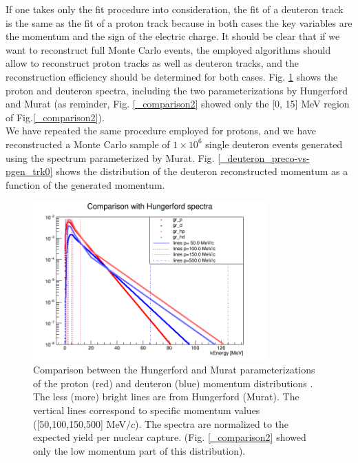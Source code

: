 \documentclass[12pt,a4paper,openright, oneside, titlepage]{book} %
\begin{document}
\noindent
If one takes only the fit procedure into consideration, 
the fit of a deuteron track is the same as the fit of a proton track because 
in both cases the key variables are the momentum and the sign of the electric charge.
It should be clear that if we want to reconstruct full Monte Carlo events,
the employed algorithms should allow to reconstruct proton tracks as well as deuteron tracks,
and the reconstruction efficiency should be determined for both cases.
Fig. \ref{_comparison} shows the proton and deuteron spectra, including
the two parameterizations by Hungerford and Murat
(as reminder, Fig. \ref{_comparison2} showed only the 
[0, 15] MeV region of Fig.\ref{_comparison2}).\\
We have repeated the same procedure employed for protons,
and we have reconstructed a Monte Carlo sample of $1 \times 10^6$ single deuteron events
generated using the spectrum parameterized by Murat. 
Fig. \ref{_deuteron_preco-vs-pgen_trk0} shows the distribution of the deuteron reconstructed momentum 
as a function of the generated momentum. 

\begin{figure}[h!]
\centering
\includegraphics[width =0.8\textwidth, keepaspectratio]{new_spectra_2/comparison}
\caption[Comparison of two parameterizaion on the full momentum range]
{Comparison between the Hungerford and Murat parameterizations of the proton (red)  and deuteron (blue)
momentum distributions \cite{Hungerford} \cite{Pasha:spectra}. 
The less (more) bright lines are from Hungerford (Murat). 
The vertical lines correspond to specific momentum values ([50,100,150,500] MeV$/c$). The spectra are normalized to the expected yield per nuclear capture.
(Fig. \ref{_comparison2} showed only the low momentum part of this distribution). }
\label{_comparison}
\end{figure}
\end{document}
